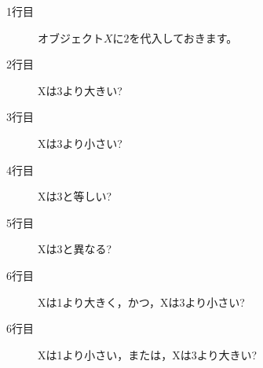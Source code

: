 \begin{description}
	\item[1行目] オブジェクト$X$に$2$を代入しておきます。
	\item[2行目] Xは3より大きい?
	\item[3行目] Xは3より小さい?
	\item[4行目] Xは3と等しい?
	\item[5行目] Xは3と異なる?
	\item[6行目] Xは1より大きく，かつ，Xは3より小さい?
	\item[6行目] Xは1より小さい，または，Xは3より大きい?
\end{description}
